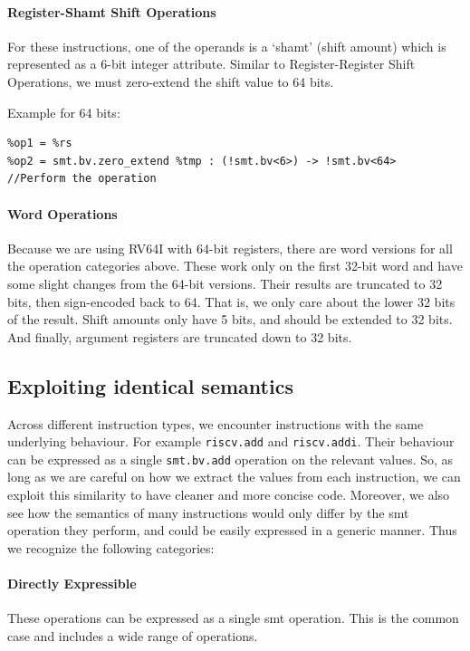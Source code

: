 \paragraph{Register-Shamt Shift Operations} 
For these instructions, one of the operands is a `shamt' (shift amount) which is represented 
as a 6-bit integer attribute. Similar to Register-Register Shift Operations, we must zero-extend
the shift value to 64 bits.

Example for 64 bits: 
\begin{verbatim}
%op1 = %rs
%op2 = smt.bv.zero_extend %tmp : (!smt.bv<6>) -> !smt.bv<64>
//Perform the operation
\end{verbatim}

\paragraph{Word Operations} Because we are using RV64I with 64-bit registers, there are word versions
for all the operation categories above. These work only on the first 32-bit word and have some slight
changes from the 64-bit versions. Their results are truncated to 32 bits, then sign-encoded back to 64. 
That is, we only care about the lower 32 bits of the result. Shift amounts only have 5 bits, and should
be extended to 32 bits. And finally, argument registers are truncated down to 32 bits.

\subsection{Exploiting identical semantics}

Across different instruction types, we encounter instructions with the same underlying behaviour.
For example \texttt{riscv.add} and \texttt{riscv.addi}. Their behaviour can be expressed as a single
\texttt{smt.bv.add} operation on the relevant values. So, as long as we are careful on how we extract
the values from each instruction, we can exploit this similarity to have cleaner and more concise code.
%
Moreover, we also see how the semantics of many instructions would only differ by the smt operation they perform, and
could be easily expressed in a generic manner. Thus we recognize the following categories:

\paragraph{Directly Expressible}
These operations can be expressed as a single smt operation.
This is the common case and includes a wide range of operations.

